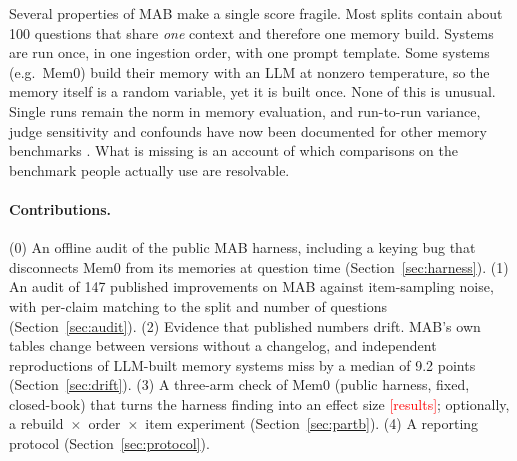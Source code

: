 \documentclass[11pt,a4paper]{article}
\newcommand{\tbd}[1]{\textcolor{red}{[#1]}}
\begin{document}
Several properties of MAB make a single score fragile. Most splits contain about 100 questions that share
\emph{one} context and therefore one memory build. Systems are run once, in one ingestion order, with one prompt
template. Some systems (e.g.\ Mem0) build their memory with an LLM at nonzero temperature, so the memory itself is
a random variable, yet it is built once. None of this is unusual. Single runs remain the norm in memory
evaluation, and run-to-run variance, judge sensitivity and confounds have now been documented for other memory
benchmarks \citep{chanhnourack2026auditing,mishra2026merit,spencer2026groundtruth,wang2026memdelta,jung2026meme}.
What is missing is an account of which comparisons on the benchmark people actually use are resolvable.

\paragraph{Contributions.} (0) An offline audit of the public MAB harness, including a keying bug that disconnects Mem0 from its
memories at question time (Section~\ref{sec:harness}). (1) An audit of 147 published improvements on MAB against item-sampling noise, with
per-claim matching to the split and number of questions (Section~\ref{sec:audit}). (2) Evidence that published
numbers drift. MAB's own tables change between versions without a changelog, and independent reproductions of
LLM-built memory systems miss by a median of 9.2 points (Section~\ref{sec:drift}). (3) A three-arm check of Mem0 (public harness, fixed, closed-book) that turns the harness finding into an effect
size \tbd{results}; optionally, a rebuild~$\times$~order~$\times$~item experiment (Section~\ref{sec:partb}). (4) A reporting protocol (Section~\ref{sec:protocol}).
\end{document}
